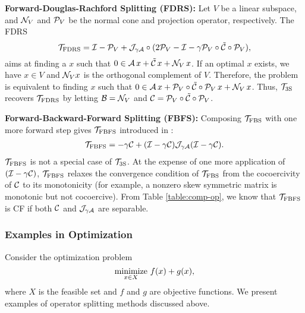 {\textbf{Forward-Douglas-Rachford Splitting (FDRS):} Let $V$ be  a linear subspace, and ${\mathcal{N}}_V$ and ${\mathcal{P}}_V$ be the normal cone and projection operator, respectively. The FDRS~\cite{briceno2015FDRS} 
 $${{\mathcal{T}}_{\mathrm{FDRS}}}={\mathcal{I}}-{\mathcal{P}}_V+{\mathcal{J}}_{\gamma{\mathcal{A}}}\circ(2{\mathcal{P}}_V-{\mathcal{I}}-\gamma {\mathcal{P}}_V\circ\tilde{{\mathcal{C}}}\circ{\mathcal{P}}_V),$$
aims at finding a $x$ such that $0\in{\mathcal{A}}\,x+\tilde{{\mathcal{C}}}\,x+{\mathcal{N}}_V\,x$. If an optimal $x$ exists, we have $x\in V$ and ${\mathcal{N}}_Vx$ is the orthogonal complement of $V$. Therefore, the problem is equivalent to finding $x$ such that $0\in{\mathcal{A}}\,x+{\mathcal{P}}_V\circ\tilde{{\mathcal{C}}}\circ{\mathcal{P}}_V\,x+{\mathcal{N}}_V\,x$. Thus, ${{\mathcal{T}}_{\mathrm{3S}}}$ recovers ${{\mathcal{T}}_{\mathrm{FDRS}}}$ by letting ${\mathcal{B}}={\mathcal{N}}_V$ and ${\mathcal{C}}={\mathcal{P}}_V\circ\tilde{{\mathcal{C}}}\circ{\mathcal{P}}_V$.

\textbf{Forward-Backward-Forward Splitting (FBFS):} Composing ${{\mathcal{T}}_{\mathrm{FBS}}}$ with one more forward step gives ${{\mathcal{T}}_{\mathrm{FBFS}}}$ introduced in \cite{FBF_Tseng}:
\begin{align}\label{eqn:fbf}
\TFBFS = -\gamma \cC  + (\cI-\gamma \cC)\cJ_{\gamma \cA}(\cI-\gamma \cC).
\end{align} %
${{\mathcal{T}}_{\mathrm{FBFS}}}$ is not  a special case of ${{\mathcal{T}}_{\mathrm{3S}}}$. At the expense of one more application of $({\mathcal{I}}-\gamma {\mathcal{C}})$, ${{\mathcal{T}}_{\mathrm{FBFS}}}$ relaxes the convergence condition  of ${{\mathcal{T}}_{\mathrm{FBS}}}$ from  the cocoercivity of ${\mathcal{C}}$ {to its monotonicity (for example, a nonzero skew symmetric matrix is monotonic but not cocoercive)}. 
From Table \ref{table:comp-op}, we know that ${{\mathcal{T}}_{\mathrm{FBFS}}}$ is CF if both ${\mathcal{C}}$ and ${\mathcal{J}}_{\gamma {\mathcal{A}}}$ are separable.

\subsubsection{Examples in Optimization}
Consider the optimization problem
\begin{equation}\label{eq:opt-example}
\Min_{x\in X}\, f(x)+g(x),
\end{equation}
where $X$ is the feasible set and $f$ and $g$ are objective functions. We present examples of operator splitting methods discussed above.


}
